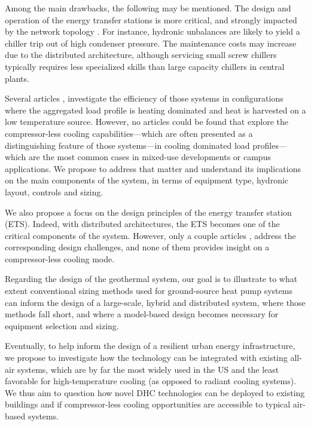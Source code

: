 Among the main drawbacks, the following may be mentioned.
The design and operation of the energy transfer stations is more critical, and strongly impacted by the network topology \citep{Wetter2019}. For instance, hydronic unbalances are likely to yield a chiller trip out of high condenser pressure.
The maintenance costs may increase due to the distributed architecture, although servicing small screw chillers typically requires less specialized skills than large capacity chillers in central plants.

Several articles \citep{Wetter2019}, \citep{Sommer2020} investigate the efficiency of those systems in configurations where the aggregated load profile is heating dominated and heat is harvested on a low temperature source.
However, no articles could be found that explore the compressor-less cooling capabilities---which are often presented as a distinguishing feature of those systems---in cooling dominated load profiles---which are the most common cases in mixed-use developments or campus applications.
We propose to address that matter and understand its implications on the main components of the system, in terms of equipment type, hydronic layout, controls and sizing.

We also propose a focus on the design principles of the energy transfer station (ETS).
Indeed, with distributed architectures, the ETS becomes one of the critical components of the system.
However, only a couple articles \citep{Buffa2020}, \citep{Wetter2019} address the corresponding design challenges, and none of them provides insight on a compressor-less cooling mode.

Regarding the design of the geothermal system, our goal is to illustrate to what extent conventional sizing methods used for ground-source heat pump systems \citep{Kavanaugh2014} can inform the design of a large-scale, hybrid and distributed system, where those methods fall short, and where a model-based design becomes necessary for equipment selection and sizing.

Eventually, to help inform the design of a resilient urban energy infrastructure, we propose to investigate how the technology can be integrated with existing all-air systems, which are by far the most widely used in the US and the least favorable for high-temperature cooling (as opposed to radiant cooling systems).
We thus aim to question how novel DHC technologies can be deployed to existing buildings and if compressor-less cooling opportunities are accessible to typical air-based systems.

